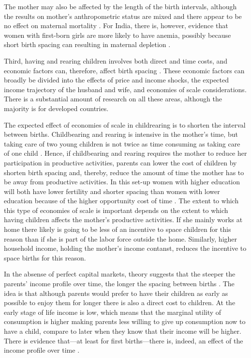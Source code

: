 The mother may also be affected by the length of the birth intervals, although the
results on mother's anthropometric status are mixed and there appear to be no
effect on maternal mortality \citep{Ronsmans1998,Menken2003,Dewey2007,Conde-Agudelo2012}.
For India, there is, however, evidence that women with first-born girls are more likely to 
have anemia, possibly because short birth spacing can resulting in maternal depletion 
\citep{Milazzo2018}.

Third, having and rearing children involves both direct and time costs, and economic factors 
can, therefore, affect birth spacing \citep{Hotz1997,Schultz1997}.
These economic factors can broadly be divided into 
the effects of price and income shocks,
the expected income trajectory of the husband and wife,
and economies of scale considerations.
There is a substantial amount of research on all these areas, although the majority is for
developed countries.

The expected effect of economies of scale in childrearing is to shorten the interval between 
births.
Childbearing and rearing is intensive in the mother's time, but taking care of two young
children is not twice as time consuming as taking care of one child 
\citep{Vijverberg1982,Espenshade1984}.
Hence, if childbearing and rearing requires the mother to reduce her participation in productive 
activities, parents can lower the cost of children by shorten birth spacing and, thereby, reduce
the amount of time the mother has to be away from productive activities.
In this set-up women with higher education will both have lower fertility and shorter
spacing than women with lower education because of the higher opportunity cost of time 
\citep{Ross1974,Newman1981,Newman1984}.
The extent to which this type of economies of scale is important depends on the extent to
which having children affects the mother's productive activities.
If she mainly works at home there likely is going to be less of an incentive to space 
children for this reason than if she is part of the labor force outside the home.
Similarly, higher household income, holding the mother's income contanst, reduces the incentive 
to space births for this reason.

In the absense of perfect capital markets, theory suggests that the steeper the parents' income 
profile over time, the longer the spacing between births 
\citep{Heckman1976,Wolpin1984,Newman1988}.
The idea is that although parents would prefer to have their children as early as possible to
enjoy them for longer there is also a direct cost to children.
At the early stage of life income is low, which means that the marginal utility of consumption 
is higher making parents less willing to give up consumption now to have a child, compare to 
later when they know that their income will be higher.
There is evidence that---at least for first births---there is, indeed, an effect of the income
profile over time \citep{Newman1984,Happel1984}.

